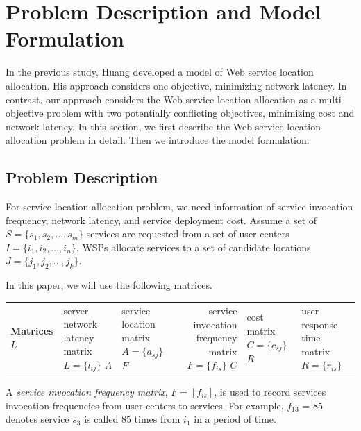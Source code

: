 \section{Problem Description and Model Formulation}
In the previous study, Huang \cite{EnhancedGenetic} developed a model of Web service location allocation. His approach considers one objective, minimizing network latency. In contrast,
our approach considers the Web service location allocation as a multi-objective problem with two potentially conflicting objectives, minimizing cost and network latency. In this section, we first describe the Web service location allocation problem in detail.  Then we introduce the model formulation.

\subsection{Problem Description}
For service location allocation problem, we need information of service invocation frequency, network latency, and service deployment cost.
Assume a set of $S = \{ s_{1}, s_{2}, \dots,  s_{m}\}$ services are
requested from a set of user centers $I = \{ i_{1}, i_{2}, \dots,  i_{n} \}$. 
WSPs allocate services to a set of candidate locations $J = \{ j_{1}, j_{2}, \dots,  j_{k} \}$.

In this paper, we will use the following matrices.
\begin{center}
{
	\footnotesize
	\begin{tabular}{l*{2}{l}r}
		\hline
		\textbf{Matrices} \cr
		$L$ & server network latency matrix $L = \{l_{ij}\}$ \cr
		$A$ & service location matrix $A = \{a_{sj}\}$ \cr
		$F$ & service invocation frequency matrix $F = \{f_{is}\}$ \cr
		$C$ & cost matrix $C = \{c_{sj}\}$ \cr
		$R$ & user response time matrix $R = \{r_{is}\}$ \cr
		\hline
	\end{tabular}
}
\end{center}

A \emph{service invocation frequency matrix}, $F= [f_{is}]$, is used to record services invocation frequencies from user centers to services. For example, $f_{13}$ = 85 denotes service $s_{3}$ is called 85 times from $i_1$ in a period of time.


